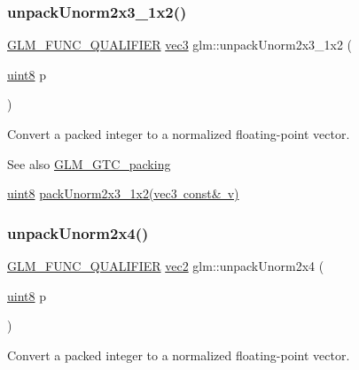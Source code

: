 \subsubsection{\texorpdfstring{unpack\+Unorm2x3\+\_\+1x2()}{unpackUnorm2x3\_1x2()}}
{\footnotesize\ttfamily \mbox{\hyperlink{setup_8hpp_a33fdea6f91c5f834105f7415e2a64407}{G\+L\+M\+\_\+\+F\+U\+N\+C\+\_\+\+Q\+U\+A\+L\+I\+F\+I\+ER}} \mbox{\hyperlink{group__core__types_ga1c47e8b3386109bc992b6c48e91b0be7}{vec3}} glm\+::unpack\+Unorm2x3\+\_\+1x2 (\begin{DoxyParamCaption}\item[{\mbox{\hyperlink{group__gtc__type__precision_ga1a7dcd8aac97cc8020817c94049deff2}{uint8}}}]{p }\end{DoxyParamCaption})}

Convert a packed integer to a normalized floating-\/point vector.

\begin{DoxySeeAlso}{See also}
\mbox{\hyperlink{group__gtc__packing}{G\+L\+M\+\_\+\+G\+T\+C\+\_\+packing}} 

\mbox{\hyperlink{group__gtc__type__precision_ga1a7dcd8aac97cc8020817c94049deff2}{uint8}} \mbox{\hyperlink{group__gtc__packing_ga0acca4eb99c300fe2edeef7ebd8fa08b}{pack\+Unorm2x3\+\_\+1x2(vec3 const\& v)}} 
\end{DoxySeeAlso}
\mbox{\label{group__gtc__packing_ga3afb0452954320f2d83fe6f38cb24147}} 
\subsubsection{\texorpdfstring{unpack\+Unorm2x4()}{unpackUnorm2x4()}}
{\footnotesize\ttfamily \mbox{\hyperlink{setup_8hpp_a33fdea6f91c5f834105f7415e2a64407}{G\+L\+M\+\_\+\+F\+U\+N\+C\+\_\+\+Q\+U\+A\+L\+I\+F\+I\+ER}} \mbox{\hyperlink{group__core__types_gaa1618f51db67eaa145db101d8c8431d8}{vec2}} glm\+::unpack\+Unorm2x4 (\begin{DoxyParamCaption}\item[{\mbox{\hyperlink{group__gtc__type__precision_ga1a7dcd8aac97cc8020817c94049deff2}{uint8}}}]{p }\end{DoxyParamCaption})}

Convert a packed integer to a normalized floating-\/point vector.

